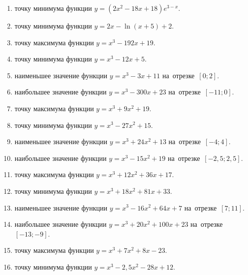\documentclass[a4paper,10pt]{article}
\begin{document}
\begin{enumerate}
\item {} точку минимума функции $y=\left(2x^2-18x+18\right){{e}^{3-x}}$.

\item {} точку минимума функции $y=2x-\ln \left(x+5\right)+2$.

\item {} точку максимума функции $y=x^3 -192x +19$.

\item {} точку минимума функции $y=x^3 -12x+5$.

\item {} наименьшее значение функции $y=x^3 -3x+11$ на~отрезке~$\left[0;2\right]$.

\item {} наибольшее значение функции $y=x^3 -300x+23$ на~отрезке~$\left[-11;0\right]$.

\item {} точку максимума функции $y=x^3 +9x^2+19$.

\item {} точку минимума функции $y=x^3 -27x^2+15$.

\item {} наименьшее значение функции $y=x^3 +24x^2+13$ на~отрезке~$\left[-4;4\right]$.

\item {} наибольшее значение функции $y=x^3 -15x^2+19$ на~отрезке~$\left[-2,5;2,5\right]$.

\item {} точку максимума функции $y=x^3 +12x^2+36x+17$.

\item {} точку минимума функции $y=x^3 +18x^2+81x+33$.

\item {} наименьшее значение функции $y=x^3 -16x^2+64x+7$ на~отрезке~$\left[7;11\right]$.

\item {} наибольшее значение функции $y=x^3 +20x^2+100x+23$ на~отрезке~$\left[-13;-9\right]$.

\item {} точку максимума функции $y=x^3 +7x^2+8x-23$.

\item {} точку минимума функции $y=x^3 -2,5x^2-28x+12$.


\end{enumerate}
\end{document}
